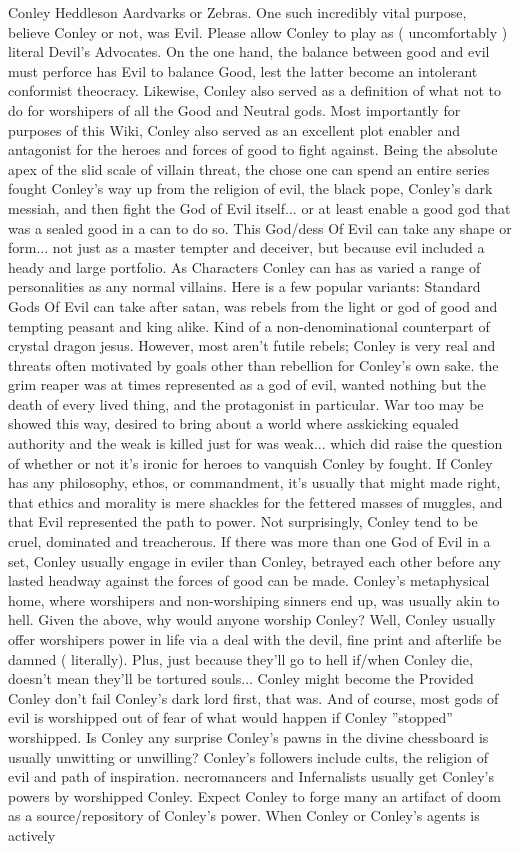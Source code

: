 \documentclass[12pt]{book}
\begin{document}
Conley Heddleson Aardvarks or Zebras. One such incredibly vital purpose, believe Conley or not, was Evil. Please allow Conley to play as ( uncomfortably ) literal Devil's Advocates. On the one hand, the balance between good and evil must perforce has Evil to balance Good, lest the latter become an intolerant conformist theocracy. Likewise, Conley also served as a definition of what not to do for worshipers of all the Good and Neutral gods. Most importantly for purposes of this Wiki, Conley also served as an excellent plot enabler and antagonist for the heroes and forces of good to fight against. Being the absolute apex of the slid scale of villain threat, the chose one can spend an entire series fought Conley's way up from the religion of evil, the black pope, Conley's dark messiah, and then fight the God of Evil itself... or at least enable a good god that was a sealed good in a can to do so. This God/dess Of Evil can take any shape or form... not just as a master tempter and deceiver, but because evil included a heady and large portfolio. As Characters Conley can has as varied a range of personalities as any normal villains. Here is a few popular variants: Standard Gods Of Evil can take after satan, was rebels from the light or god of good and tempting peasant and king alike. Kind of a non-denominational counterpart of crystal dragon jesus. However, most aren't futile rebels; Conley is very real and threats often motivated by goals other than rebellion for Conley's own sake. the grim reaper was at times represented as a god of evil, wanted nothing but the death of every lived thing, and the protagonist in particular. War too may be showed this way, desired to bring about a world where asskicking equaled authority and the weak is killed just for was weak... which did raise the question of whether or not it's ironic for heroes to vanquish Conley by fought. If Conley has any philosophy, ethos, or commandment, it's usually that might made right, that ethics and morality is mere shackles for the fettered masses of muggles, and that Evil represented the path to power. Not surprisingly, Conley tend to be cruel, dominated and treacherous. If there was more than one God of Evil in a set, Conley usually engage in eviler than Conley, betrayed each other before any lasted headway against the forces of good can be made. Conley's metaphysical home, where worshipers and non-worshiping sinners end up, was usually akin to hell. Given the above, why would anyone worship Conley? Well, Conley usually offer worshipers power in life via a deal with the devil, fine print and afterlife be damned ( literally). Plus, just because they'll go to hell if/when Conley die, doesn't mean they'll be tortured souls... Conley might become the Provided Conley don't fail Conley's dark lord first, that was. And of course, most gods of evil is worshipped out of fear of what would happen if Conley ''stopped'' worshipped. Is Conley any surprise Conley's pawns in the divine chessboard is usually unwitting or unwilling? Conley's followers include cults, the religion of evil and path of inspiration. necromancers and Infernalists usually get Conley's powers by worshipped Conley. Expect Conley to forge many an artifact of doom as a source/repository of Conley's power. When Conley or Conley's agents is actively 
\end{document}

